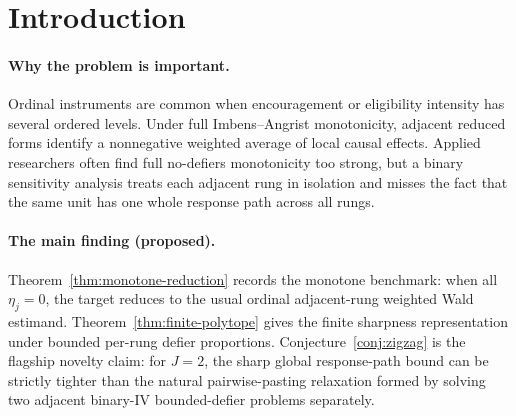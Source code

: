 \documentclass[11pt]{article}
\theoremstyle{definition}
\theoremstyle{plain}
\theoremstyle{remark}
\begin{document}
\begin{abstract}
This proposal asks for sharp partial-identification bounds on an ordinal-instrument LATE when Imbens--Angrist monotonicity is relaxed to allow a calibrated fraction of down-defiers on each adjacent instrument rung.  The routine result is a finite response-path sharpness theorem: the identified set is the projection of one latent table over full ordinal treatment-response paths, not a product of adjacent binary-IV tables.  The novel kernel is the zig-zag compatibility conjecture: with three instrument levels, adjacent pairwise bounded-defier LATE bounds can be strictly too wide because the same response path \(010\) is an up-complier on one rung and a down-defier on the next, so its treatment effect must be shared with opposite signs across reduced forms.  This phenomenon is invisible in binary-instrument sensitivity analyses and in full-monotonicity ordinal-IV formulas.  If resolved, it would give a formal criterion for when per-rung monotonicity sensitivity can be calibrated locally and when the ordinal response-path geometry itself tightens the LATE bounds.
\end{abstract}

\section{Introduction}
\paragraph{Why the problem is important.}
Ordinal instruments are common when encouragement or eligibility intensity has several ordered levels.  Under full Imbens--Angrist monotonicity, adjacent reduced forms identify a nonnegative weighted average of local causal effects.  Applied researchers often find full no-defiers monotonicity too strong, but a binary sensitivity analysis treats each adjacent rung in isolation and misses the fact that the same unit has one whole response path across all rungs.

\paragraph{The main finding (proposed).}
Theorem~\ref{thm:monotone-reduction} records the monotone benchmark: when all \(\eta_j=0\), the target reduces to the usual ordinal adjacent-rung weighted Wald estimand.  Theorem~\ref{thm:finite-polytope} gives the finite sharpness representation under bounded per-rung defier proportions.  Conjecture~\ref{conj:zigzag} is the flagship novelty claim: for \(J=2\), the sharp global response-path bound can be strictly tighter than the natural pairwise-pasting relaxation formed by solving two adjacent binary-IV bounded-defier problems separately.
\end{document}
